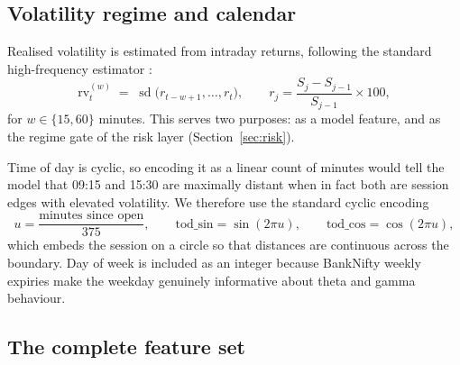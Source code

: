 \documentclass[11pt,a4paper]{article}
\begin{document}
\subsection{Volatility regime and calendar}

Realised volatility is estimated from intraday returns, following the standard
high-frequency estimator \cite{andersen}:
\begin{equation}
\text{rv}^{(w)}_t \;=\; \operatorname{sd}\big(r_{t-w+1},\dots,r_t\big),
\qquad r_j = \frac{S_j - S_{j-1}}{S_{j-1}}\times 100,
\end{equation}
for $w \in \{15,60\}$ minutes. This serves two purposes: as a model feature, and as the
regime gate of the risk layer (Section~\ref{sec:risk}).

Time of day is cyclic, so encoding it as a linear count of minutes would tell the model
that 09:15 and 15:30 are maximally distant when in fact both are session edges with
elevated volatility. We therefore use the standard cyclic encoding
\begin{equation}
u = \frac{\text{minutes since open}}{375},\qquad
\text{tod\_sin} = \sin(2\pi u),\qquad \text{tod\_cos} = \cos(2\pi u),
\end{equation}
which embeds the session on a circle so that distances are continuous across the
boundary. Day of week is included as an integer because BankNifty weekly expiries make
the weekday genuinely informative about theta and gamma behaviour.

\subsection{The complete feature set}
\end{document}
